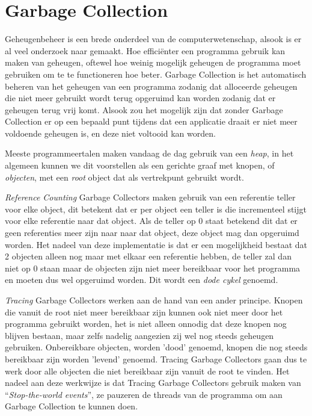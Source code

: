 \section{Garbage Collection}
\label{sec:Garbage collection}
Geheugenbeheer is een brede onderdeel van de computerwetenschap, alsook is er al veel onderzoek naar gemaakt.
Hoe efficiënter een programma gebruik kan maken van geheugen, oftewel hoe weinig mogelijk geheugen de programma moet gebruiken om te te functioneren hoe beter.
Garbage Collection is het automatisch beheren van het geheugen van een programma zodanig dat alloceerde geheugen die niet meer gebruikt wordt terug opgeruimd kan worden zodanig dat er geheugen terug vrij komt.
Alsook zou het mogelijk zijn dat zonder Garbage Collection er op een bepaald punt tijdens dat een applicatie draait er niet meer voldoende geheugen is, en deze niet voltooid kan worden.

Meeste programmeertalen maken vandaag de dag gebruik van een \textit{heap}, in het algemeen kunnen we dit voorstellen als een gerichte graaf met knopen, of \textit{objecten}, met een \textit{root} object dat als vertrekpunt gebruikt wordt.


\textit{Reference Counting} Garbage Collectors maken gebruik van een referentie teller voor elke object, dit betekent dat er per object een teller is die incrementeel stijgt voor elke referentie naar dat object.
Als de teller op 0 staat betekend dit dat er geen referenties meer zijn naar naar dat object, deze object mag dan  opgeruimd worden.
Het nadeel van deze implementatie is dat er een mogelijkheid bestaat dat 2 objecten alleen nog maar met elkaar een referentie hebben, de teller zal dan niet op 0 staan maar de objecten zijn niet meer bereikbaar voor het programma en moeten dus wel opgeruimd worden.
Dit wordt een \textit{dode cykel} genoemd.\autocite{VanderCruysse2019}

\textit{Tracing} Garbage Collectors werken aan de hand van een ander principe.
Knopen die vanuit de root niet meer bereikbaar zijn kunnen ook niet meer door het programma gebruikt worden, het is niet alleen onnodig dat deze knopen nog blijven bestaan, maar zelfs nadelig aangezien zij wel nog steeds geheugen gebruiken.
Onbereikbare objecten, worden 'dood' genoemd, knopen die nog steeds bereikbaar zijn worden 'levend' genoemd.
Tracing Garbage Collectors gaan dus te werk door alle objecten die niet bereikbaar zijn vanuit de root te vinden. 
Het nadeel aan deze werkwijze is dat Tracing Garbage Collectors gebruik maken van ``\textit{Stop-the-world events}'', ze pauzeren de threads van de programma om aan Garbage Collection te kunnen doen.

